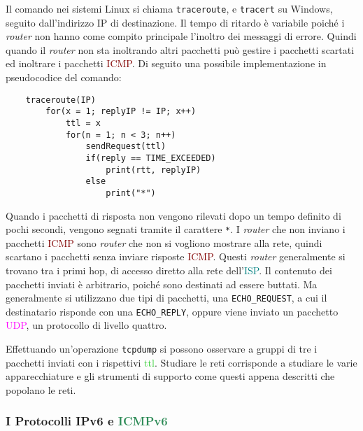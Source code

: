 \documentclass{article}
\numberwithin{equation}{subsection}
\begin{document}
Il comando nei sistemi Linux si chiama \verb|traceroute|, e \verb|tracert| su Windows, seguito dall'indirizzo \textcolor{Bittersweet}{IP} di destinazione. Il tempo di ritardo è variabile 
poiché i \textit{router} non hanno come compito principale l'inoltro dei messaggi di errore. Quindi quando il \textit{router} non sta inoltrando altri pacchetti può gestire 
i pacchetti scartati ed inoltrare i pacchetti \textcolor{Maroon}{ICMP}. Di seguito una possibile implementazione in pseudocodice del comando:

\begin{verbatim}
    traceroute(IP)
        for(x = 1; replyIP != IP; x++)
            ttl = x
            for(n = 1; n < 3; n++)
                sendRequest(ttl)
                if(reply == TIME_EXCEEDED)
                    print(rtt, replyIP)
                else
                    print("*")
\end{verbatim}

Quando i pacchetti di risposta non vengono rilevati dopo un tempo definito di pochi secondi, vengono segnati tramite il carattere \verb|*|. I \textit{router} che non inviano i 
pacchetti \textcolor{Maroon}{ICMP} sono \textit{router} che non si vogliono mostrare alla rete, quindi scartano i pacchetti senza inviare risposte \textcolor{Maroon}{ICMP}. Questi \textit{router} generalmente si trovano tra i primi 
hop, di accesso diretto alla rete dell'\textcolor{teal}{ISP}. 
Il contenuto dei pacchetti inviati è arbitrario, poiché sono destinati ad essere buttati. Ma generalmente si utilizzano due tipi di pacchetti, una \verb|ECHO_REQUEST|, 
a cui il destinatario risponde con una \verb|ECHO_REPLY|, oppure viene inviato un pacchetto \textcolor{Fuchsia}{UDP}, un protocollo di livello quattro. 

Effettuando un'operazione \verb|tcpdump| si possono osservare a gruppi di tre i pacchetti inviati con i rispettivi \textcolor{LimeGreen}{ttl}. 
Studiare le reti corrisponde a studiare le varie apparecchiature e gli strumenti di supporto come questi appena descritti che popolano le reti. 

\subsubsection{I Protocolli \textcolor{OliveGreen}{IPv6} e \textcolor{SeaGreen}{ICMPv6}}
\end{document}
